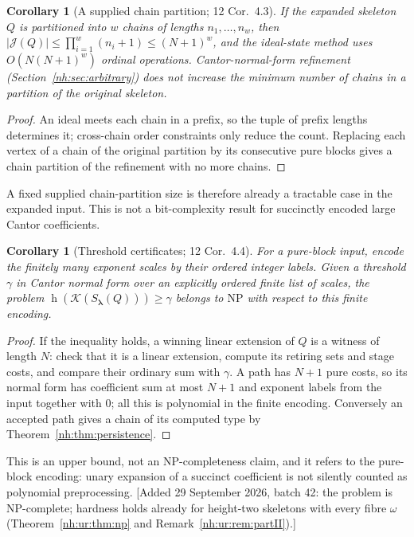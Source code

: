\documentclass[11pt,a4paper]{article}
\newtheorem{corollary}[theorem]{Corollary}
\theoremstyle{definition}
\theoremstyle{remark}
\newcommand{\K}{\mathcal K}
\newcommand{\hgt}{\operatorname{h}}
\newcommand{\J}{\mathcal J}
\begin{document}
\begin{corollary}[A supplied chain partition; 12 Cor.~4.3]\label{nh:cor:chaincover}
If the expanded skeleton $Q$ is partitioned into $w$ chains of lengths
$n_1,\dots,n_w$, then $|\J(Q)|\le\prod_{i=1}^w(n_i+1)\le(N+1)^w$, and the
ideal-state method uses $O(N(N+1)^w)$ ordinal operations.
Cantor-normal-form refinement (Section~\ref{nh:sec:arbitrary}) does not
increase the minimum number of chains in a partition of the original skeleton.
\end{corollary}
\begin{proof}
An ideal meets each chain in a prefix, so the tuple of prefix lengths
determines it; cross-chain order constraints only reduce the count. Replacing
each vertex of a chain of the original partition by its consecutive pure blocks
gives a chain partition of the refinement with no more chains.
\end{proof}

A fixed supplied chain-partition size is therefore already a tractable case in
the expanded input. This is not a bit-complexity result for succinctly encoded
large Cantor coefficients.

\begin{corollary}[Threshold certificates; 12 Cor.~4.4]\label{nh:cor:NP}
For a pure-block input, encode the finitely many exponent scales by their
ordered integer labels. Given a threshold $\gamma$ in Cantor normal form over
an explicitly ordered finite list of scales, the problem
$\hgt(\K(S_{\boldsymbol\lambda}(Q)))\ge\gamma$ belongs to $\mathrm{NP}$ with
respect to this finite encoding.
\end{corollary}
\begin{proof}
If the inequality holds, a winning linear extension of $Q$ is a witness of
length $N$: check that it is a linear extension, compute its retiring sets and
stage costs, and compare their ordinary sum with $\gamma$. A path has $N+1$
pure costs, so its normal form has coefficient sum at most $N+1$ and exponent
labels from the input together with $0$; all this is polynomial in the finite
encoding. Conversely an accepted path gives a chain of its computed type by
Theorem~\ref{nh:thm:persistence}.
\end{proof}

This is an upper bound, not an NP-completeness claim, and it refers to the
pure-block encoding: unary expansion of a succinct coefficient is not silently
counted as polynomial preprocessing.
[Added 29 September 2026, batch 42: the problem is NP-complete; hardness holds
already for height-two skeletons with every fibre $\omega$
(Theorem~\ref{nh:ur:thm:np} and Remark~\ref{nh:ur:rem:partII}).]
\end{document}
